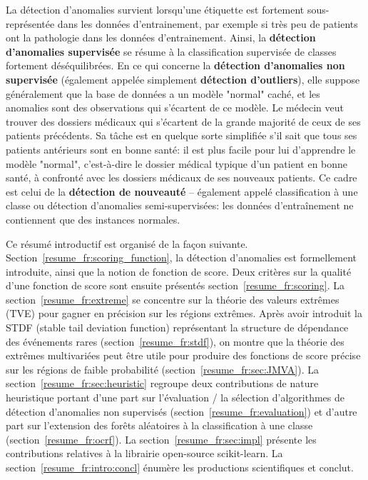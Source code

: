 La détection d'anomalies survient lorsqu'une étiquette est fortement sous-représentée dans les données d'entrainement, par exemple si très peu de patients ont la pathologie dans les données d'entrainement.
Ainsi, la \textbf{détection d'anomalies supervisée} se résume à la classification supervisée de classes fortement déséquilibrées.
En ce qui concerne la \textbf {détection d'anomalies non supervisée} (également appelée simplement \textbf{détection d'outliers}), elle suppose généralement que la base de données a un modèle "normal" caché, et les anomalies sont des observations qui s'écartent de ce modèle. Le médecin veut trouver des dossiers médicaux qui s'écartent de la grande majorité de ceux de ses patients précédents.
%
Sa tâche est en quelque sorte simplifiée s'il sait que tous ses patients antérieurs sont en bonne santé: il est plus facile pour lui d'apprendre le modèle "normal", c'est-à-dire le dossier médical typique d'un patient en bonne santé, à confronté avec les dossiers médicaux de ses nouveaux patients. Ce cadre est celui de la \textbf {détection de nouveauté} -- également appelé classification à une classe ou détection d'anomalies semi-supervisées: les données d'entraînement ne contiennent que des instances normales.

Ce résumé introductif est organisé de la façon suivante.
Section~\ref{resume_fr:scoring_function}, la détection d'anomalies est formellement introduite, ainsi que la notion de fonction de score.
Deux critères sur la qualité d'une fonction de score sont ensuite présentés section~\ref{resume_fr:scoring}.
La section~\ref{resume_fr:extreme} se concentre sur la théorie des valeurs extrêmes (TVE) pour gagner en précision sur les régions extrêmes. Après avoir introduit la STDF (stable tail deviation function) représentant la structure de dépendance des événements rares (section~\ref{resume_fr:stdf}), on montre que la théorie des extrêmes multivariées peut être utile pour produire des fonctions de score précise sur les régions de faible probabilité (section~\ref{resume_fr:sec:JMVA}).
La section~\ref{resume_fr:sec:heuristic} regroupe deux contributions de nature heuristique portant d'une part sur l'évaluation / la sélection d'algorithmes de détection d'anomalies non supervisés (section~\ref{resume_fr:evaluation}) et d'autre part sur l'extension des forêts aléatoires à la classification à une classe (section~\ref{resume_fr:ocrf}). La section~\ref{resume_fr:sec:impl} présente les contributions relatives à la librairie open-source scikit-learn. La section~\ref{resume_fr:intro:concl} énumère les productions scientifiques et conclut.


